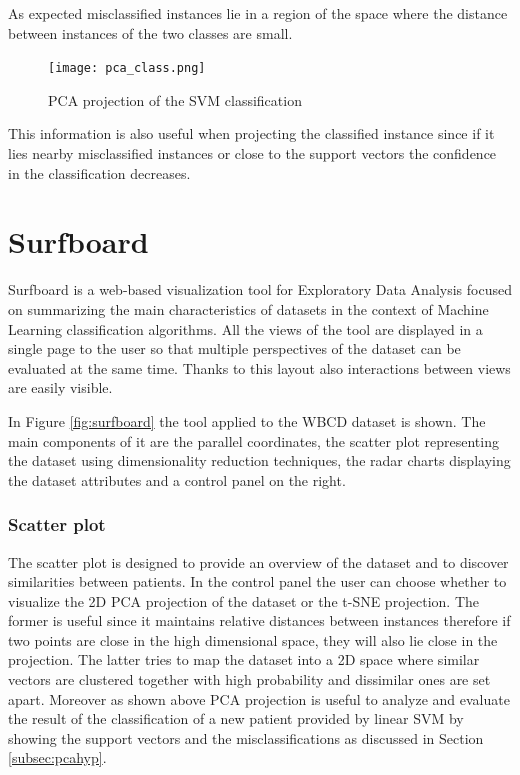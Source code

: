 \documentclass{article}
\begin{document}
As expected misclassified instances lie in a region of the space where the
distance between instances of the two classes are small.

\begin{figure}
\centering
\texttt{[image: pca\_class.png]} \\
\caption{PCA projection of the SVM classification}
\label{fig:pca_class}
\end{figure}

This information is also useful when projecting the classified instance since
if it lies nearby misclassified instances or close to the support vectors the
confidence in the classification decreases.

\section{Surfboard}

Surfboard is a web-based visualization tool for Exploratory Data Analysis
focused on summarizing the main characteristics of datasets in the context of
Machine Learning classification algorithms. All the views of the tool are
displayed in a single page to the user so that multiple perspectives of the
dataset can be evaluated at the same time. Thanks to this layout also
interactions between views are easily visible.

In Figure \ref{fig:surfboard} the
tool applied to the WBCD dataset is shown. The main components of it are the
parallel coordinates, the scatter plot representing the dataset using
dimensionality reduction techniques, the radar charts displaying the dataset
attributes and a control panel on the right.

\subsubsection*{Scatter plot}

The scatter plot is designed to provide an overview of the dataset and
to discover similarities between patients. In the control panel the user can
choose whether to visualize the 2D PCA projection of the dataset or the t-SNE
projection. The former is useful since it maintains relative distances between
instances therefore if two points are close in the high dimensional space, they
will also lie close in the projection. The latter tries to map the dataset into
a 2D space where similar vectors are clustered together with high probability
and dissimilar ones are set apart. Moreover as shown above PCA projection is
useful to analyze and evaluate the result of the classification of a new
patient provided by linear SVM by showing the support vectors and the
misclassifications as discussed in Section \ref{subsec:pcahyp}.
\end{document}
